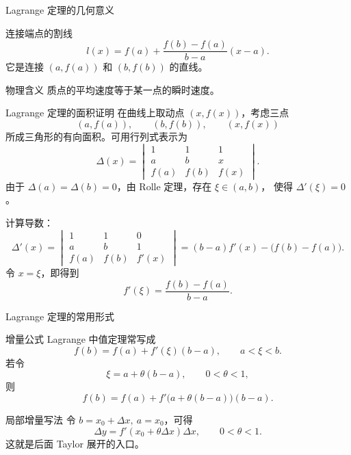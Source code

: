 \documentclass[aspectratio=169,10pt]{ctexbeamer}
\begin{document}
\begin{frame}{Lagrange 定理的几何意义}
\small
\begin{block}{连接端点的割线}
\[
  l(x)=f(a)+\frac{f(b)-f(a)}{b-a}(x-a).
\]
它是连接 $(a,f(a))$ 和 $(b,f(b))$ 的直线。
\end{block}
\vspace{-0.5em}
\begin{center}
\end{center}
\vspace{-0.7em}
\begin{alertblock}{物理含义}
质点的平均速度等于某一点的瞬时速度。
\end{alertblock}
\end{frame}

\begin{frame}{Lagrange 定理的面积证明}
\footnotesize
在曲线上取动点 $(x,f(x))$，考虑三点
\[
  (a,f(a)),\qquad (b,f(b)),\qquad (x,f(x))
\]
所成三角形的有向面积。可用行列式表示为
\[
  \Delta(x)=
  \begin{vmatrix}
  1&1&1\\
  a&b&x\\
  f(a)&f(b)&f(x)
  \end{vmatrix}.
\]
由于 $\Delta(a)=\Delta(b)=0$，由 Rolle 定理，存在 $\xi\in(a,b)$，
使得 $\Delta'(\xi)=0$。

计算导数：
\[
  \Delta'(x)=
  \begin{vmatrix}
  1&1&0\\
  a&b&1\\
  f(a)&f(b)&f'(x)
  \end{vmatrix}
  =(b-a)f'(x)-\bigl(f(b)-f(a)\bigr).
\]
令 $x=\xi$，即得到
\[
  f'(\xi)=\frac{f(b)-f(a)}{b-a}.
\]
\end{frame}

\begin{frame}{Lagrange 定理的常用形式}
\small
\begin{block}{增量公式}
Lagrange 中值定理常写成
\[
  f(b)=f(a)+f'(\xi)(b-a),\qquad a<\xi<b.
\]
若令
\[
  \xi=a+\theta(b-a),\qquad 0<\theta<1,
\]
则
\[
  f(b)=f(a)+f'\bigl(a+\theta(b-a)\bigr)(b-a).
\]
\end{block}

\begin{alertblock}{局部增量写法}
令 $b=x_0+\Delta x,\ a=x_0$，可得
\[
  \Delta y=f'(x_0+\theta\Delta x)\Delta x,\qquad 0<\theta<1.
\]
这就是后面 Taylor 展开的入口。
\end{alertblock}
\end{frame}
\end{document}
